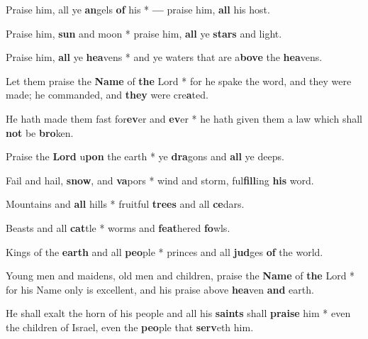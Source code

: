 \begin{multicols}{2}
	Praise him, all ye \textbf{an}gels \textbf{of} his * \textbf{---} praise him, \textbf{all} his host.
	
	Praise him, \textbf{sun} and moon * praise him, \textbf{all} ye \textbf{stars} and light.
	
	Praise him, \textbf{all} ye \textbf{hea}vens * and ye waters that are a\textbf{bove} the \textbf{hea}vens.
	
	Let them praise the \textbf{Name} of \textbf{the} Lord * for he spake the word, and they were made; he commanded, and \textbf{they} were cre\textbf{a}ted.
	
	He hath made them fast for\textbf{ev}er and \textbf{ev}er * he hath given them a law which shall \textbf{not} be \textbf{bro}ken.
	
	Praise the \textbf{Lord} u\textbf{pon} the earth * ye \textbf{dra}gons and \textbf{all} ye deeps.
	
	Fail and hail, \textbf{snow}, and \textbf{va}pors * wind and storm, ful\textbf{fill}ing \textbf{his} word.
	
	Mountains and \textbf{all} hills * fruitful \textbf{trees} and all \textbf{ce}dars.
	
	Beasts and all \textbf{cat}tle * worms and \textbf{feat}hered \textbf{fo}wls.
	
	Kings of the \textbf{earth} and all \textbf{peo}ple * princes and all \textbf{jud}ges \textbf{of} the world.
	
	Young men and maidens, old men and children, praise the \textbf{Name} of \textbf{the} Lord * for his Name only is excellent, and his praise above \textbf{hea}ven \textbf{and} earth.
	
	He shall exalt the horn of his people and all his \textbf{saints} shall \textbf{praise} him * even the children of Israel, even the \textbf{peo}ple that \textbf{serv}eth him.
\end{multicols}